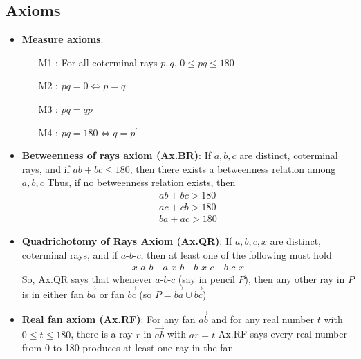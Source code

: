 \documentclass{report}
\begin{document}
    \subsection{Axioms}
    \begin{itemize}
        \item \textbf{Measure axioms}:
            \begin{enumerate}
                \item [M1]: For all coterminal rays $p,q$, $0 \leq pq \leq 180$
                \item [M2]: $pq = 0 \iff p=q$
                \item [M3]: $pq = qp$
                \item [M4]: $pq = 180 \iff q=p^{\prime} $
            \end{enumerate}
                \item \textbf{Betweenness of rays axiom (Ax.BR)}: If $a,b,c$ are distinct, coterminal rays, and if $ab+bc \leq 180$, then there exists a betweenness relation among $a,b,c$
                    \bigbreak \noindent 
                    Thus, if no betweenness relation exists, then
                    \begin{align*}
                        ab + bc > 180 \\
                        ac + cb > 180 \\
                        ba + ac > 180
                    \end{align*}
                \item \textbf{Quadrichotomy of Rays Axiom (Ax.QR)}: If $a,b,c,x$ are distinct, coterminal rays, and if $ a\text{-}b\text{-}c$, then at least one of the following must hold
                    \begin{align*}
                        x\text{-}a\text{-}b \quad a\text{-}x\text{-}b \quad b\text{-}x\text{-}c \quad b\text{-}c\text{-}x
                    \end{align*}
                    \bigbreak \noindent 
                    So, Ax.QR says that whenever $ a\text{-}b\text{-}c$ (say in pencil $P$), then any other ray in $P$ is in either fan $\overrightarrow{ba}$ or fan $\overrightarrow{bc} $ (so $P = \overrightarrow{ba} \cup \overrightarrow{bc} $)
                \item \textbf{Real fan axiom (Ax.RF)}: For any fan $\overrightarrow{ab} $ and for any real number $t$ with $ 0 \leq t \leq 180$, there is a ray $r$ in $\overrightarrow{ab} $ with $ar = t $
                    \bigbreak \noindent 
                    Ax.RF says every real number from 0 to 180 produces at least one ray in the fan

\end{itemize}
\end{document}
